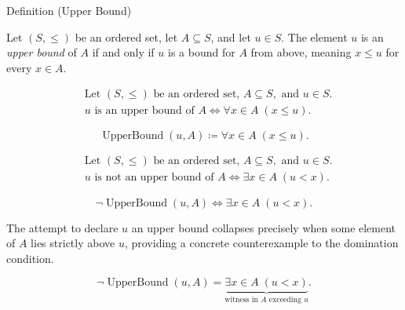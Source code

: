 \begin{definitionbox}{Definition (Upper Bound)}
\begin{definition}
\label{def:upper-bound}
Let $(S,\le)$ be an ordered set, let $A\subseteq S$, and let $u\in S$. The element $u$ is an \emph{upper bound} of $A$ if and only if $u$ is a bound for $A$ from above, meaning $x\le u$ for every $x\in A$.
\end{definition}
\end{definitionbox}

\begin{remark*}
\[
\begin{aligned}
&\text{Let }(S,\le)\text{ be an ordered set, }A\subseteq S,\text{ and }u\in S.\\
&u \text{ is an upper bound of } A
\Longleftrightarrow
\forall x\in A\;(x\le u).
\end{aligned}
\]
\end{remark*}

\begin{remark*}
\[
\operatorname{UpperBound}(u,A)\coloneqq \forall x\in A\;(x\le u).
\]
\end{remark*}

\begin{remark*}
\[
\begin{aligned}
&\text{Let }(S,\le)\text{ be an ordered set, }A\subseteq S,\text{ and }u\in S.\\
&u \text{ is not an upper bound of } A
\Longleftrightarrow
\exists x\in A\;(u<x).
\end{aligned}
\]
\end{remark*}

\begin{remark*}
\[
\neg\operatorname{UpperBound}(u,A)\Longleftrightarrow \exists x\in A\;(u<x).
\]
\end{remark*}

\begin{remark*}
The attempt to declare $u$ an upper bound collapses precisely when some element of $A$ lies strictly above $u$, providing a concrete counterexample to the domination condition.
\end{remark*}

\begin{remark*}
\[
\neg\operatorname{UpperBound}(u,A)
=
\underbrace{\exists x\in A\;(u<x)}_{\text{witness in }A\text{ exceeding }u}.
\]
\end{remark*}

